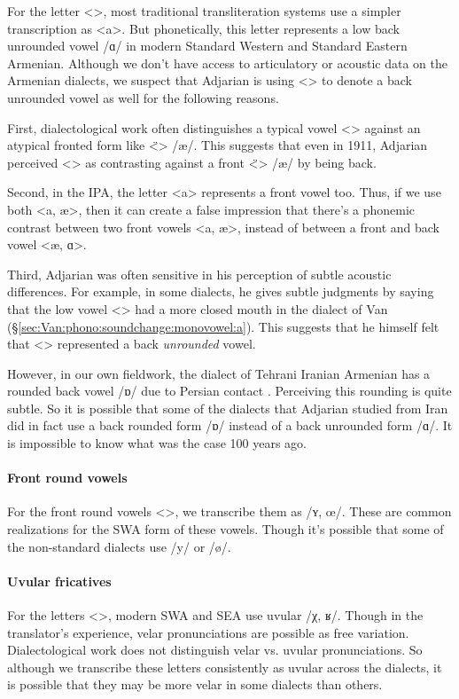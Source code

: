 For the letter <>, most traditional transliteration systems use a simpler transcription as <a>. But phonetically, this letter represents a low back unrounded vowel /ɑ/ in modern Standard Western and Standard Eastern Armenian. Although we don't have access to articulatory or acoustic data on the Armenian dialects, we suspect that Adjarian is using <> to denote a back unrounded vowel as well for the following reasons. 


First, dialectological work often distinguishes a typical vowel <> against an atypical fronted form like <̈> /æ/. This suggests that even in 1911, Adjarian perceived <> as contrasting against a front <̈> /æ/ by being back. 

Second, in the IPA, the letter <a> represents a front vowel too. Thus, if we use both <a, æ>, then it can create a false impression that there's a phonemic contrast between two front vowels <a, æ>, instead of between a front and back vowel <æ, ɑ>. 

Third, Adjarian was often sensitive in his perception of subtle acoustic differences. For example, in some dialects, he gives subtle judgments by saying that the low vowel <> had a more closed mouth in the dialect of Van (\S\ref{sec:Van:phono:soundchange:monovowel:a}). This suggests that he himself felt that <> represented a back \textit{unrounded} vowel. 

However, in our own fieldwork, the dialect of Tehrani Iranian Armenian has a rounded back vowel /ɒ/ due to Persian contact \citep{DolatianEtAl-prep-IranianGrammar}. Perceiving this rounding is quite subtle. So it is possible that some of the dialects that Adjarian studied from Iran did in fact use a back rounded form /ɒ/ instead of a back unrounded form /ɑ/. It is impossible to know what was the case 100 years ago.
\paragraph{Front round vowels}
For the front round vowels <>, we transcribe them as /ʏ, œ/. These are common realizations for the SWA form of these vowels. Though it's possible that some of the non-standard dialects use /y/ or /ø/. 

\paragraph{Uvular fricatives}
For the letters <>, modern SWA and SEA use uvular /χ, ʁ/. Though in the translator's experience, velar pronunciations are possible as free variation. Dialectological work does not distinguish velar vs. uvular pronunciations. So although we transcribe these letters consistently as uvular across the dialects, it is possible that they may be more velar in some dialects than others. 

